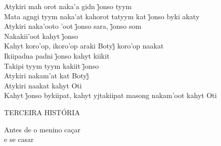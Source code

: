 \bigskip

\begin{linenumbers}\begingroup\raggedright
\noindent Atykiri mah orot naka’a gidn j̃onso tyym\\
Mata agngi tyym naka’at kahorot tatyym kat j̃onso byki akaty\\
Atykiri naka’ooto ’oot j̃onso sara, j̃onso som\\
Nakakii’oot kahyt j̃onso\\
Kahyt koro’op, ikoro’op araki Botyj̃ koro’op naakat\\
Ikiipadna padni j̃onso kahyt kiikit\\
Takipi tyym tyym kakiit j̃onso\\
Atykiri nakam’at kat Botyj̃\\
Atykiri naakat kahyt Oti\\
Kahyt j̃onso bykiipat, kahyt yjtakiipat masong nakam’oot kahyt Oti
\end{linenumbers}\endgroup


\blankpage
\pagebreak
\thispagestyle{empty}
\mbox{}
\begin{center}
\vspace{4cm}
{\formularlight\small TERCEIRA HISTÓRIA}

\medskip

{\formular\huge Antes de o menino caçar\\\vspace{0.2cm} e se casar}
\end{center}
\pagebreak

